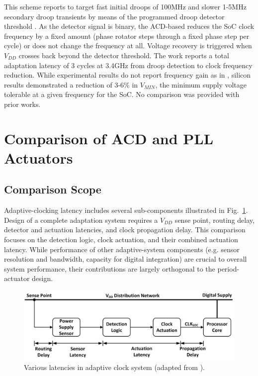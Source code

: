 \documentclass[twoside,9pt,journal,letterpage]{IEEEtran}
\begin{document}
This scheme reports to target fast initial droops of 100MHz and slower 1-5MHz secondary droop transients by means of the programmed droop detector threshold \cite{wilcox2015}. As the detector signal is binary, the ACD-based reduces the SoC clock frequency by a fixed amount (phase rotator steps through a fixed phase step per cycle) or does not change the frequency at all. Voltage recovery is triggered when $V_{DD}$ crosses back beyond the detector threshold. The work reports a total adaptation latency of 3 cycles at 3.4GHz from droop detection to clock frequency reduction. While experimental results do not report frequency gain as in \cite{hashimoto2018}, silicon results demonstrated a reduction of 3-6\% in $V_{MIN}$, the minimum supply voltage tolerable at a given frequency for the SoC. No comparison was provided with prior works.

\section{Comparison of ACD and PLL Actuators}
\label{sec:comparison}

\subsection{Comparison Scope}
\label{sec:Scope of comparison}

Adaptive-clocking latency includes several sub-components illustrated in Fig.\ \ref{fig:scope}. Design of a complete adaptation system requires a $V_{DD}$ sense point, routing delay, detector and actuation latencies, and clock propagation delay. This comparison focuses on the detection logic, clock actuation, and their combined actuation latency. While performance of other adaptive-system components (e.g. sensor resolution and bandwidth, capacity for digital integration) are crucial to overall system performance, their contributions are largely orthogonal to the period-actuator design. 

\begin{figure}[h]
	\centering
	\includegraphics[width=0.8\columnwidth]{fig_scope}
	\caption{Various latencies in adaptive clock system (adapted from \cite{hashimoto2018}).}
	\label{fig:scope}
\end{figure}
\end{document}
